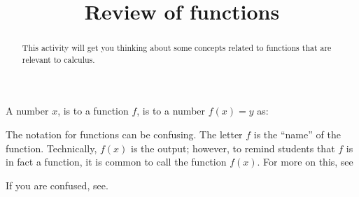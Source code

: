 \documentclass{ximera}
\title{Review of functions}
\begin{document}
\begin{abstract}
  This activity will get you thinking about some concepts related to
  functions that are relevant to calculus.
\end{abstract}
\maketitle


\begin{question}
  A number $x$, is to a function $f$, is to a number $f(x)=y$ as:
  \begin{solution}
    \begin{hint}
      The notation for functions can be confusing. The letter $f$ is
      the ``name'' of the function. Technically, $f(x)$ is the output;
      however, to remind students that $f$ is in fact a function, it
      is common to call the function $f(x)$. For more on this,
      see
    \end{hint}
    \begin{hint}
      If you are confused, see.
    \end{hint}
    \begin{multiple-choice}
    \end{multiple-choice}
  \end{solution}
\end{question}
\end{document}
